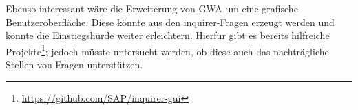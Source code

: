 Ebenso interessant wäre die Erweiterung von \gls{GWA} um eine grafische Benutzeroberfläche. Diese könnte aus den inquirer-Fragen erzeugt werden und könnte die Einstiegshürde weiter erleichtern. Hierfür gibt es bereits hilfreiche Projekte\footnote{\url{https://github.com/SAP/inquirer-gui}}; jedoch müsste untersucht werden, ob diese auch das nachträgliche Stellen von Fragen unterstützen.